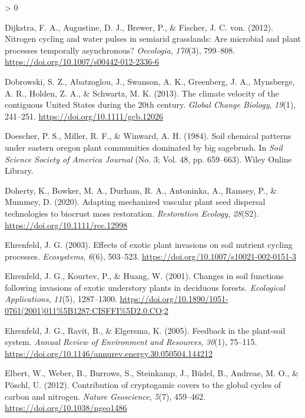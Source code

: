 \documentclass[
  11pt,
  a4paper,
]{article}
\newlength{\cslhangindent}
\newenvironment{CSLReferences}[2] %
 {%
  \setlength{\parindent}{0pt}
  \ifodd #1 \everypar{\setlength{\hangindent}{\cslhangindent}}\ignorespaces\fi
  \ifnum #2 > 0
  \setlength{\parskip}{#2\baselineskip}
  \fi
 }%
 {}
\begin{document}
\begin{CSLReferences}{1}{0}
\leavevmode\hypertarget{ref-Dijkstra2012}{}%
Dijkstra, F. A., Augustine, D. J., Brewer, P., \& Fischer, J. C. von. (2012). {Nitrogen cycling and water pulses in semiarid grasslands: Are microbial and plant processes temporally asynchronous?} \emph{Oecologia}, \emph{170}(3), 799--808. \url{https://doi.org/10.1007/s00442-012-2336-6}

\leavevmode\hypertarget{ref-Dobrowski2013}{}%
Dobrowski, S. Z., Abatzoglou, J., Swanson, A. K., Greenberg, J. A., Mynsberge, A. R., Holden, Z. A., \& Schwartz, M. K. (2013). {The climate velocity of the contiguous United States during the 20th century}. \emph{Global Change Biology}, \emph{19}(1), 241--251. \url{https://doi.org/10.1111/gcb.12026}

\leavevmode\hypertarget{ref-Doescher1984}{}%
Doescher, P. S., Miller, R. F., \& Winward, A. H. (1984). Soil chemical patterns under eastern oregon plant communities dominated by big sagebrush. In \emph{Soil Science Society of America Journal} (No. 3; Vol. 48, pp. 659--663). Wiley Online Library.

\leavevmode\hypertarget{ref-Doherty2020}{}%
Doherty, K., Bowker, M. A., Durham, R. A., Antoninka, A., Ramsey, P., \& Mummey, D. (2020). Adapting mechanized vascular plant seed dispersal technologies to biocrust moss restoration. \emph{Restoration Ecology}, \emph{28}(S2). \url{https://doi.org/10.1111/rec.12998}

\leavevmode\hypertarget{ref-Ehrenfeld2003}{}%
Ehrenfeld, J. G. (2003). {Effects of exotic plant invasions on soil nutrient cycling processes}. \emph{Ecosystems}, \emph{6}(6), 503--523. \url{https://doi.org/10.1007/s10021-002-0151-3}

\leavevmode\hypertarget{ref-Ehrenfeld2001}{}%
Ehrenfeld, J. G., Kourtev, P., \& Huang, W. (2001). {Changes in soil functions following invasions of exotic understory plants in deciduous forests}. \emph{Ecological Applications}, \emph{11}(5), 1287--1300. \url{https://doi.org/10.1890/1051-0761(2001)011\%5B1287:CISFFI\%5D2.0.CO;2}

\leavevmode\hypertarget{ref-Ehrenfeld2005}{}%
Ehrenfeld, J. G., Ravit, B., \& Elgersma, K. (2005). {Feedback in the plant-soil system}. \emph{Annual Review of Environment and Resources}, \emph{30}(1), 75--115. \url{https://doi.org/10.1146/annurev.energy.30.050504.144212}

\leavevmode\hypertarget{ref-Elbert2012}{}%
Elbert, W., Weber, B., Burrows, S., Steinkamp, J., Büdel, B., Andreae, M. O., \& Pöschl, U. (2012). {Contribution of cryptogamic covers to the global cycles of carbon and nitrogen}. \emph{Nature Geoscience}, \emph{5}(7), 459--462. \url{https://doi.org/10.1038/ngeo1486}


\end{CSLReferences}
\end{document}
